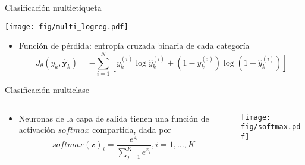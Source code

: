 \documentclass[aspectratio=169,9pt]{beamer}
\begin{document}
\begin{frame}{Clasificación multietiqueta}
 \begin{center}
	\texttt{[image: fig/multi\_logreg.pdf]}
\end{center}

\begin{itemize}
	\item Función de pérdida: entropía cruzada binaria de cada categoría
	$$
		J_\theta({y}_k, \mathbf{\hat{y}}_k) = -\sum_{i=1}^N  \left[ y^{(i)}_k \log{\hat{y}^{(i)}_k} + (1 - y^{(i)}_k) \log{(1 - \hat{y}^{(i)}_k)} \right]
	$$
\end{itemize}
\end{frame}


\begin{frame}{Clasificación multiclase}
\begin{columns}
	\begin{column}{0.50\textwidth}
		\begin{itemize}
			\item Neuronas de la capa de salida tienen una función de activación $softmax$ compartida, dada por
			$$
			softmax(\mathbf{z})_i = \frac{e^{z_i}}{\sum_{j = 1}^K e^{z_j}}, i = 1, \ldots, K
			$$
		\end{itemize}
	\end{column}
	\begin{column}{0.40\textwidth}
			\begin{center}
			\texttt{[image: fig/softmax.pdf]}
		\end{center}
	\end{column}
\end{columns}
\end{frame}
\end{document}
